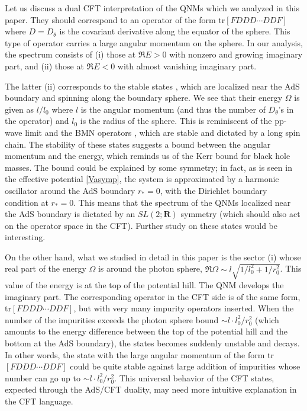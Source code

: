\documentclass[a4paper,11pt]{article}
\begin{document}
Let us discuss a dual CFT interpretation of the QNMs which we analyzed in this paper. They should correspond to an operator of the form tr$[FDDD\cdots DDF]$ where $D=D_\theta$ is the covariant derivative along the equator of the sphere. This type of operator carries a large angular momentum on the sphere.
In our analysis, the spectrum consists of (i) those at $\Re E>0$ with nonzero and growing imaginary part, and (ii) those at $\Re E<0$ with almost vanishing imaginary part.

The latter (ii) corresponds to the stable states \cite{Festuccia:2008zx}, which are localized near the AdS boundary and spinning along the boundary sphere.
We see that their energy $\Omega$ is given as $l/l_0$ where $l$ is the angular momentum (and thus the number of $D_\theta$'s in the operator) and $l_0$ is the radius of the sphere. This is reminiscent of the pp-wave limit and the BMN operators \cite{Berenstein:2002jq}, which are stable and dictated by a long spin chain. The stability of these states suggests a bound between the angular momentum and the energy, which reminds us of the Kerr bound for black hole masses. The bound could be explained by some symmetry; in fact, as is seen in the effective potential \eqref{Vasymp}, the system is approximated by a harmonic oscillator around the AdS boundary $r_*=0$, with the Dirichlet boundary condition at $r_*=0$. This means that the spectrum of the QNMs localized near the AdS boundary is dictated by an $SL(2;\mathbf{R})$ symmetry (which should also act on the operator space in the CFT). Further study on these states would be interesting.

On the other hand, what we studied in detail in this paper is the sector (i) whose real part of the energy $\Omega$ is around the photon sphere, $\Re \Omega\sim l\sqrt{1/l_0^2 + 1/r_0^2}$. This value of the energy is at the top of the potential hill. The QNM develops the imaginary part. The corresponding operator in the CFT side is of the same form, tr$[FDDD\cdots DDF]$, but with very many impurity operators inserted. When the number of the impurities exceeds the photon sphere bound $\sim l \cdot l_0^2/r_0^2$ (which amounts to the energy difference between the top of the potential hill and the bottom at the AdS boundary), the states becomes suddenly unstable and decays.
In other words, the state with the large angular momentum of the form tr$[FDDD\cdots DDF]$ could be quite stable against large addition of impurities whose number can go up to $\sim l \cdot l_0^2/r_0^2$. This universal behavior of the CFT states, expected through the AdS/CFT duality, may need more intuitive explanation in the CFT language.
\end{document}
